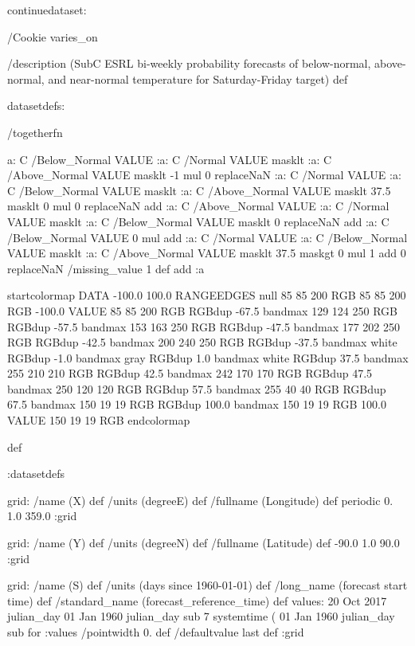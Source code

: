 \begin{ingrid}

continuedataset:



/Cookie varies_on

/description (SubC ESRL bi-weekly probability forecasts of below-normal, above-normal, and near-normal temperature for Saturday-Friday target) def

datasetdefs:

/togetherfn {
 a:
    C /Below_Normal VALUE
    :a:
     C /Normal VALUE
     masklt
    :a:
     C /Above_Normal VALUE
     masklt
    -1 mul
    0 replaceNaN
    :a:
     C /Normal VALUE
     :a:
      C /Below_Normal VALUE
      masklt
     :a:
      C /Above_Normal VALUE
      masklt
     37.5 masklt
     0 mul
     0 replaceNaN           
     add
    :a:
     C /Above_Normal VALUE
     :a:
      C /Normal VALUE
      masklt
     :a:
      C /Below_Normal VALUE
      masklt
     0 replaceNaN
     add
 :a:
     C /Below_Normal VALUE
     0 mul
     add
    :a:
     C /Normal VALUE
     :a:
      C /Below_Normal VALUE
      masklt
     :a:
      C /Above_Normal VALUE        
      masklt
     37.5 maskgt
     0 mul
     1 add
     0 replaceNaN
     /missing_value 1 def
     add
    :a

startcolormap
DATA -100.0 100.0 RANGEEDGES
null 85 85 200 RGB
85 85 200 RGB -100.0 VALUE
85 85 200 RGB RGBdup -67.5 bandmax
129 124 250 RGB RGBdup -57.5 bandmax
153 163 250 RGB RGBdup -47.5 bandmax
177 202 250 RGB RGBdup -42.5 bandmax
200 240 250 RGB RGBdup -37.5 bandmax
white RGBdup -1.0 bandmax
gray RGBdup 1.0 bandmax
white RGBdup 37.5 bandmax
255 210 210 RGB RGBdup 42.5 bandmax
242 170 170 RGB RGBdup 47.5 bandmax
250 120 120 RGB RGBdup 57.5 bandmax
255 40 40 RGB RGBdup 67.5 bandmax
150 19 19 RGB RGBdup 100.0 bandmax
150 19 19 RGB 100.0 VALUE
150 19 19 RGB
endcolormap
} def 

:datasetdefs


grid:
/name (X) def
/units (degreeE) def
/fullname (Longitude) def
periodic
0. 1.0 359.0
:grid

grid:
/name (Y) def
/units (degreeN) def
/fullname (Latitude) def
-90.0 1.0 90.0
:grid


grid:
/name (S) def
/units (days since 1960-01-01) def
/long_name (forecast start time) def
/standard_name (forecast_reference_time) def
values:
20 Oct 2017 julian_day 01 Jan 1960 julian_day sub
7
systemtime
(%
01 Jan 1960 julian_day sub
{} for
:values
/pointwidth 0. def
/defaultvalue { last } def
:grid


\end{ingrid}

